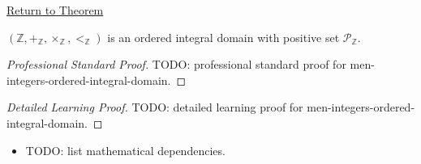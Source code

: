 \newpage
{}
\label{prf:men-integers-ordered-integral-domain}

\begin{remark*}[Return]
\hyperref[cor:men-integers-ordered-integral-domain]{Return to Theorem}
\end{remark*}

\begin{corollary*}[Mendelson 4.6]
$(\mathbb{Z},+_\mathbb{Z},\times_\mathbb{Z},<_\mathbb{Z})$ is an
ordered integral domain with positive set $\mathcal{P}_\mathbb{Z}$.
\end{corollary*}

\begin{proof}[Professional Standard Proof]
\LRAProofBodyStart
TODO: professional standard proof for men-integers-ordered-integral-domain.
\end{proof}

\begin{proof}[Detailed Learning Proof]
\LRAProofBodyStart
TODO: detailed learning proof for men-integers-ordered-integral-domain.
\end{proof}

\begin{remark*}
\end{remark*}

\begin{dependencies}
\begin{itemize}
  \item TODO: list mathematical dependencies.
\end{itemize}
\end{dependencies}

\clearpage
